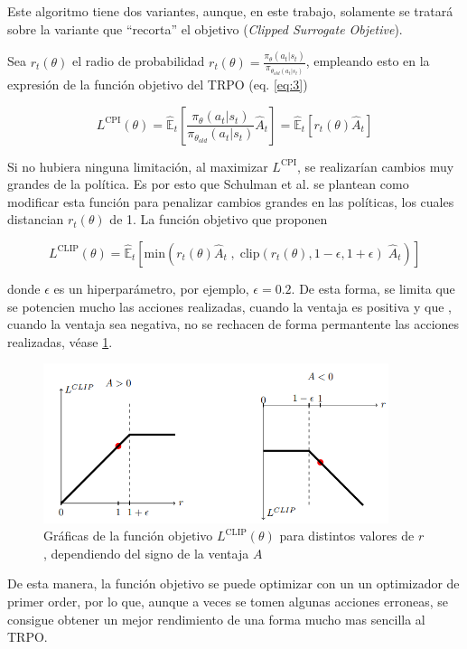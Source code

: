 Este algoritmo tiene dos variantes, aunque, en este trabajo, solamente se tratará sobre la variante que ``recorta'' el objetivo (\textit{Clipped Surrogate Objetive}).

Sea $r_t(\theta)$ el radio de probabilidad $r_t(\theta) = \frac{\pi_{\theta}(a_t|s_t)}{\pi_{\theta_{old}(a_t|s_t)}}$, empleando esto en la expresión de la función objetivo del TRPO (eq. \ref{eq:3})

\begin{equation}
	L^{\text{CPI}}	(\theta)={\mathbb{\hat E}_t} \left[ \frac{\pi_\theta (a_t|s_t)}{\pi_{\theta_{old}} (a_t|s_t)} \hat{A}_t\right]
	= 	{\mathbb{\hat E}_t} \left[ r_t(\theta)\hat{A}_t\right]
\end{equation}

Si no hubiera ninguna limitación, al maximizar $L^{\text{CPI}}$, se realizarían cambios muy grandes de la política. Es por esto que Schulman et al. se plantean como modificar esta función para penalizar cambios grandes en las políticas, los cuales distancian $r_t(\theta)$ de 1. La función objetivo que proponen

\begin{equation}
	L^{\text{CLIP}}	(\theta) = 	{\mathbb{\hat E}_t} \left[ \text{min} \left(r_t(\theta)\hat{A}_t \;,\; \text{clip}(r_t(\theta),1-\epsilon,1+\epsilon )\;\hat{A}_t \right) \right]
\end{equation}

donde $\epsilon$ es un hiperparámetro, por ejemplo, $\epsilon = 0.2$. De esta forma, se limita que se potencien mucho las acciones realizadas, cuando la ventaja es positiva y que , cuando la ventaja sea negativa, no se rechacen de forma permantente las acciones realizadas, véase \cref{ppo_clip}.
\begin{figure}[htb!]
	\centering
	\includegraphics[width=0.9\textwidth]{background/ppo_clip}
	\caption{Gráficas de la función objetivo $L^{\text{CLIP}}(\theta)$ para distintos valores de $r$, dependiendo del signo de la ventaja $A$}
	\label{ppo_clip}
\end{figure}

De esta manera, la función objetivo se puede optimizar con un un optimizador de primer order, por lo que, aunque a veces se tomen algunas acciones erroneas, se consigue obtener un mejor rendimiento de una forma mucho mas sencilla al TRPO.
